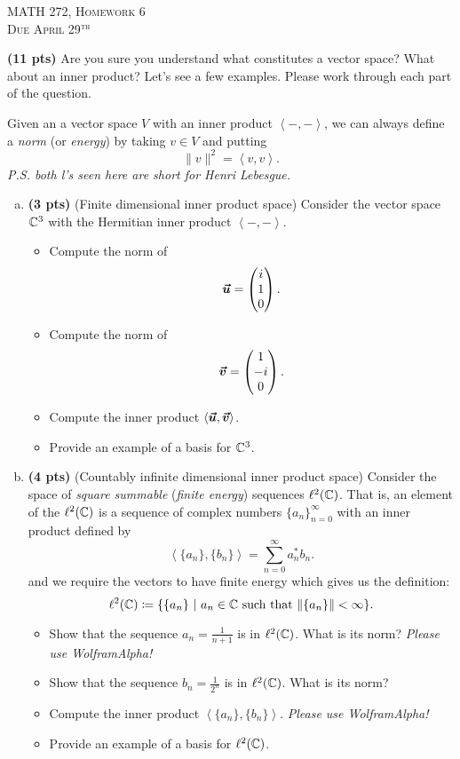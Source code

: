 \documentclass[12pt]{article} %
\newcommand{\innprod}[2]{\left\langle #1, #2\right\rangle}
\begin{document}
\begin{center}
   \textsc{\large MATH 272, Homework 6}\\
   \textsc{Due April 29$^\textrm{th}$}
\end{center}
\vspace{.5cm}



\begin{problem} \textbf{(11 pts)} Are you sure you understand what constitutes a vector space? What about an inner product? Let's see a few examples. Please work through each part of the question.

Given an a vector space $V$ with an inner product $\innprod{-}{-}$, we can always define a \emph{norm} (or \emph{energy}) by taking $v\in V$ and putting
\[
\|v\|^2 = \innprod{v}{v}.
\]
\emph{P.S. both l's seen here are short for Henri Lebesgue.}
\begin{enumerate}[(a)]
\item \textbf{(3 pts)} (Finite dimensional inner product space) Consider the vector space $\mathbb{C}^3$ with the Hermitian inner product $\innprod{-}{-}$.
\begin{itemize}
\item Compute the norm of 	
\[
		\boldsymbol{\vec{u}} = \begin{pmatrix} i \\ 1 \\ 0 \end{pmatrix}.
	\]
\item Compute the norm of
\[
\boldsymbol{\vec{v}} = \begin{pmatrix} 1 \\ -i \\ 0 \end{pmatrix}.
\]
\item Compute the inner product $\innprod{\vecu}{\vecv}$.
\item Provide an example of a basis for $\mathbb{C}^3$. 
\end{itemize}

\item \textbf{(4 pts)} (Countably infinite dimensional inner product space) Consider the space of \emph{square summable} (\emph{finite energy}) sequences $\ell^2(\mathbb{C})$. That is, an element of the $\ell^2(\mathbb{C})$ is a sequence of complex numbers $\{a_n\}_{n=0}^\infty$ with an inner product defined by
\[
\innprod{\{a_n\}}{\{b_n\}} = \sum_{n=0}^\infty a_n^* b_n.
\]
and we require the vectors to have finite energy which gives us the definition:
\[
\ell^2(\mathbb{C}) \coloneqq \{ \{a_n\} ~|~ a_n \in \mathbb{C} ~\textrm{such that $\|\{a_n\}\|<\infty$}\}.
\]
\begin{itemize}
\item Show that the sequence $a_n = \frac{1}{n+1}$ is in $\ell^2(\mathbb{C})$. What is its norm? \emph{Please use WolframAlpha!}
\item Show that the sequence $b_n = \frac{1}{2^n}$ is in $\ell^2(\mathbb{C})$. What is its norm? 
\item Compute the inner product $\innprod{\{a_n\}}{\{b_n\}}$. \emph{Please use WolframAlpha!}
\item Provide an example of a basis for $\ell^2(\mathbb{C})$.
\end{itemize}


\end{enumerate}
\end{problem}
\end{document}
